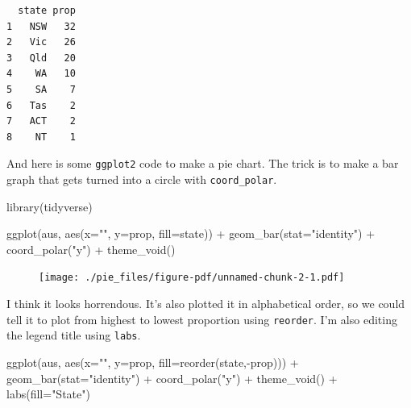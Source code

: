 \documentclass[
  letterpaper,
  DIV=11,
  numbers=noendperiod]{scrreprt}
\newenvironment{Shaded}{\begin{snugshade}}{\end{snugshade}}
\newcommand{\AttributeTok}[1]{\textcolor[rgb]{0.40,0.45,0.13}{#1}}
\newcommand{\FunctionTok}[1]{\textcolor[rgb]{0.28,0.35,0.67}{#1}}
\newcommand{\NormalTok}[1]{\textcolor[rgb]{0.00,0.23,0.31}{#1}}
\newcommand{\SpecialCharTok}[1]{\textcolor[rgb]{0.37,0.37,0.37}{#1}}
\newcommand{\StringTok}[1]{\textcolor[rgb]{0.13,0.47,0.30}{#1}}
\begin{document}
\begin{verbatim}
  state prop
1   NSW   32
2   Vic   26
3   Qld   20
4    WA   10
5    SA    7
6   Tas    2
7   ACT    2
8    NT    1
\end{verbatim}

And here is some \texttt{ggplot2} code to make a pie chart. The trick is
to make a bar graph that gets turned into a circle with
\texttt{coord\_polar}.

\begin{Shaded}
\begin{Highlighting}[]
\FunctionTok{library}\NormalTok{(tidyverse)}

\FunctionTok{ggplot}\NormalTok{(aus, }\FunctionTok{aes}\NormalTok{(}\AttributeTok{x=}\StringTok{""}\NormalTok{, }\AttributeTok{y=}\NormalTok{prop, }\AttributeTok{fill=}\NormalTok{state)) }\SpecialCharTok{+}
  \FunctionTok{geom\_bar}\NormalTok{(}\AttributeTok{stat=}\StringTok{"identity"}\NormalTok{) }\SpecialCharTok{+}
  \FunctionTok{coord\_polar}\NormalTok{(}\StringTok{"y"}\NormalTok{) }\SpecialCharTok{+}
  \FunctionTok{theme\_void}\NormalTok{()}
\end{Highlighting}
\end{Shaded}

\begin{figure}[H]

{\centering \texttt{[image: ./pie\_files/figure-pdf/unnamed-chunk-2-1.pdf]}

}

\end{figure}

I think it looks horrendous. It's also plotted it in alphabetical order,
so we could tell it to plot from highest to lowest proportion using
\texttt{reorder}. I'm also editing the legend title using \texttt{labs}.

\begin{Shaded}
\begin{Highlighting}[]
\FunctionTok{ggplot}\NormalTok{(aus, }\FunctionTok{aes}\NormalTok{(}\AttributeTok{x=}\StringTok{""}\NormalTok{, }\AttributeTok{y=}\NormalTok{prop, }\AttributeTok{fill=}\FunctionTok{reorder}\NormalTok{(state,}\SpecialCharTok{{-}}\NormalTok{prop))) }\SpecialCharTok{+}
  \FunctionTok{geom\_bar}\NormalTok{(}\AttributeTok{stat=}\StringTok{"identity"}\NormalTok{) }\SpecialCharTok{+}
  \FunctionTok{coord\_polar}\NormalTok{(}\StringTok{"y"}\NormalTok{) }\SpecialCharTok{+}
  \FunctionTok{theme\_void}\NormalTok{() }\SpecialCharTok{+}
  \FunctionTok{labs}\NormalTok{(}\AttributeTok{fill=}\StringTok{"State"}\NormalTok{)}
\end{Highlighting}
\end{Shaded}
\end{document}
